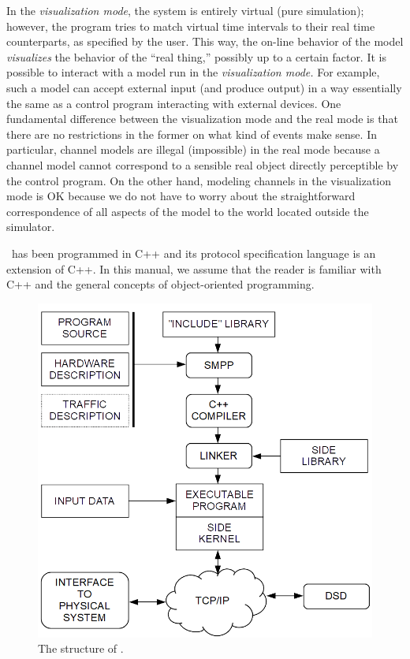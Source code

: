 In the {\em visualization mode}, the system is entirely virtual
(pure simulation); however, the program tries to match virtual
time intervals to their real time counterparts, as specified by the user.
This way, the on-line behavior of the model {\em visualizes\/} the
behavior of the ``real thing,'' possibly up to a certain factor.
It is possible to interact with a model run in the {\em visualization mode.}
For example, such a model can accept external input (and produce output)
in a way essentially the same as a control program interacting with external
devices.
One fundamental difference between the visualization mode and
the real mode is that there are no restrictions in the former on what kind of
events make sense.
In particular, channel models are illegal (impossible) in the real mode because
a channel model cannot correspond to a sensible
real object directly perceptible by the control program.
On the other hand, modeling channels in the visualization mode is OK because
we do not have to worry about the straightforward
correspondence of all aspects of the model to the world located outside
the simulator.

\smurph\ has been programmed in C++ and its protocol specification language
is an extension of C++.
In this manual, we assume that the reader is familiar with C++
and the general concepts of object-oriented programming.

\begin{figure}[htbp]%
\begin{center}
\includegraphics[scale=0.5]{FIGURES/struct.png}
\caption{The structure of \smurph.}%
\end{center}
\end{figure}%

